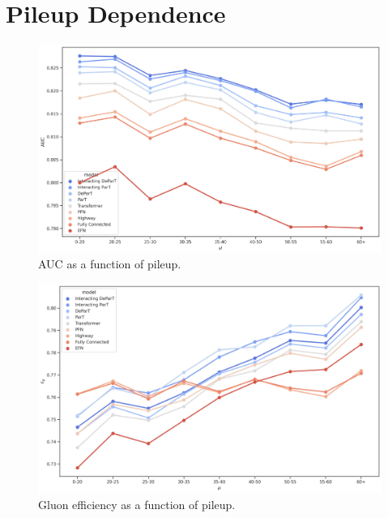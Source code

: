 \FloatBarrier

\section{Pileup Dependence}
\label{sec:app_pileup_dep}

\begin{figure}[htb]
    \centering
    \includegraphics[width=0.95\linewidth]{src/plots/results/mu_dep/auc.jpg}
    \caption{AUC as a function of pileup.}
    \label{fig:auc_pileup}
\end{figure}

\begin{figure}[htb]
    \centering
    \includegraphics[width=0.95\linewidth]{src/plots/results/mu_dep/gluon_efficiency.jpg}
    \caption{Gluon efficiency as a function of pileup.}
    \label{fig:gluon_eff_pileup}
\end{figure}

